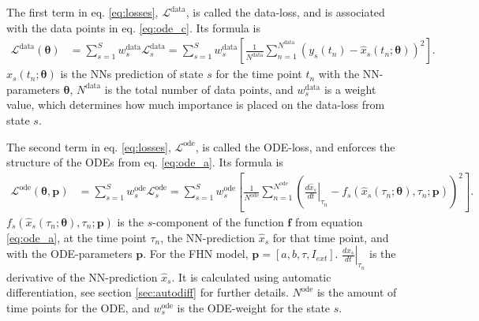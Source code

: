 The first term in eq. \ref{eq:losses}, $\mathcal{L}^{\text {data}}$, is called the data-loss, and is associated with the data points in eq. \ref{eq:ode_c}. Its formula is
\begin{align}
	\mathcal{L}^{ \text{data}}(\boldsymbol{\theta}) &= \sum_{s=1}^{S} w_{s}^{\text {data}} \mathcal{L}_{s}^{\text {data}} = \sum_{s=1}^{S} w_{s}^{\text {data}} \left[\frac{1}{N^{\text {data}}} \sum_{n=1}^{N^{\text {data}}}\left(y_{s}\left(t_{n}\right) - \hat{x}_{s} \left(t_{n} ; \boldsymbol{\theta}\right)\right)^{2} \right].
\end{align}
$\hat{x}_{s} \left(t_{n}; \boldsymbol{\theta}\right)$ is the NNs prediction of state $s$ for the time point $t_n$ with the NN-parameters $\mathbf{\theta}$, %
$N^{\text {data}}$ is the total number of data points, and $w_{s}^{\text {data}}$ is a weight value, which determines %
how much importance is placed on the data-loss from state $s$.



The second term in eq. \ref{eq:losses}, $\mathcal{L}^{\text {ode}}$, is called the ODE-loss, and enforces the structure of the ODEs from eq. \ref{eq:ode_a}. Its formula is
\begin{align}
	\mathcal{L}^{\text {ode}}(\boldsymbol{\theta}, \mathbf{p}) &= \sum_{s=1}^{S} w_{s}^{\text {ode}} \mathcal{L}_{s}^{\text {ode}} = \sum_{s=1}^{S} w_{s}^{\text {ode}} \left[\frac{1}{N^{\text {ode}}} \sum_{n=1}^{N^{\text {ode}}}\left(\left.\frac{d \hat{x}_{s}}{d t}\right|_{\tau_{n}} - f_{s}\left(\hat{x}_{s}\left(\tau_{n} ; \boldsymbol{\theta}\right), \tau_{n} ; \mathbf{p}\right)\right)^{2}\right].
\end{align}
$f_{s}\left( \hat{x}_{s}\left(\tau_{n} ; \boldsymbol{\theta}\right), \tau_{n} ; \mathbf{p}\right)$ is the $s$-component of the function $\mathbf{f}$ from equation \ref{eq:ode_a}, at the time point $\tau_{n}$, the NN-prediction $\hat{x}_{s}$ for that time point, %
and with the ODE-parameters $\mathbf{p}$. 
For the FHN model, $\mathbf{p} = [a, b, \tau, I_{ext}]$. %
$\left.\frac{d \hat{x}_{s}}{d t}\right|_{\tau_{n}}$ is the derivative of the NN-prediction $\hat{x}_{s}$. It is calculated using automatic differentiation, see section \ref{sec:autodiff} for further details. 
$N^{\text {ode}}$ is the amount of time points for the ODE, %
and $w_{s}^{\text {ode}}$ is the ODE-weight for the state $s$.

